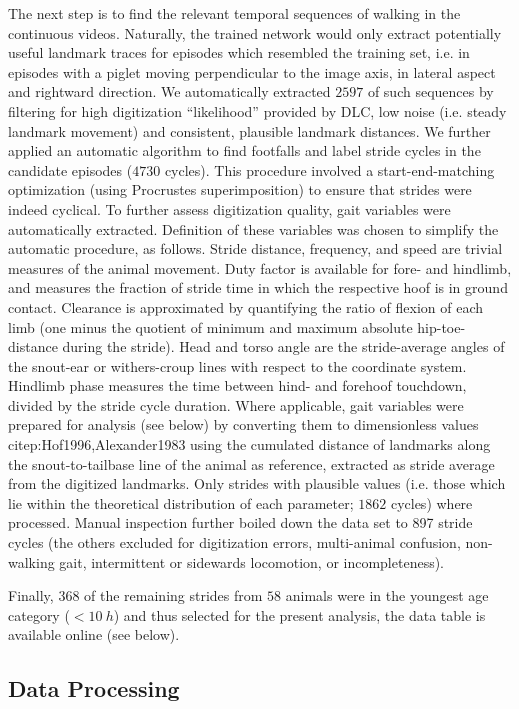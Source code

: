 \documentclass[10pt,a4paper]{article}
\begin{document}
The next step is to find the relevant temporal sequences of walking in the continuous videos.
Naturally, the trained network would only extract potentially useful landmark traces for episodes which resembled the training set, i.e. in episodes with a piglet moving perpendicular to the image axis, in lateral aspect and rightward direction.
We automatically extracted \(2597\) of such sequences by filtering for high digitization ``likelihood'' provided by DLC, low noise (i.e. steady landmark movement) and consistent, plausible landmark distances.
We further applied an automatic algorithm to find footfalls and label stride cycles in the candidate episodes (\(4730\) cycles).
This procedure involved a start-end-matching optimization (using Procrustes superimposition) to ensure that strides were indeed cyclical.
To further assess digitization quality, gait variables were automatically extracted.
Definition of these variables was chosen to simplify the automatic procedure, as follows.
Stride distance, frequency, and speed are trivial measures of the animal movement.
Duty factor is available for fore- and hindlimb, and measures the fraction of stride time in which the respective hoof is in ground contact.
Clearance is approximated by quantifying the ratio of flexion of each limb (one minus the quotient of minimum and maximum absolute hip-toe-distance during the stride).
Head and torso angle are the stride-average angles of the snout-ear or withers-croup lines with respect to the coordinate system.
Hindlimb phase measures the time between hind- and forehoof touchdown, divided by the stride cycle duration.
Where applicable, gait variables were prepared for analysis (see below) by converting them to dimensionless values citep:Hof1996,Alexander1983 using the cumulated distance of landmarks along the snout-to-tailbase line of the animal as reference, extracted as stride average from the digitized landmarks.
Only strides with plausible values (i.e. those which lie within the theoretical distribution of each parameter; \(1862\) cycles) where processed.
Manual inspection further boiled down the data set to 897 stride cycles (the others excluded for digitization errors, multi-animal confusion, non-walking gait, intermittent or sidewards locomotion, or incompleteness).

Finally, \(368\) of the remaining strides from \(58\) animals were in the youngest age category (\(<10\ h\)) and thus selected for the present analysis, the data table is available online (see below).


\subsection{Data Processing}
\label{sec:orgcb0a26c}
\end{document}
